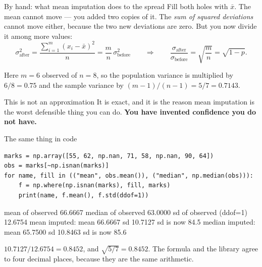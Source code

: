 \documentclass[aspectratio=169]{beamer}
\begin{document}
\begin{frame}[shrink=6]{By hand: what mean imputation does to the spread}
  Fill both holes with $\bar x$. The mean cannot move --- you added two copies
  of it. The \emph{sum of squared deviations} cannot move either, because the
  two new deviations are zero. But you now divide it among more values:
  \[
    \sigma^2_{\text{after}}
    = \frac{\sum_{i=1}^{m}(x_i - \bar x)^2}{n}
    = \frac{m}{n}\,\sigma^2_{\text{before}}
    \qquad\Longrightarrow\qquad
    \frac{\sigma_{\text{after}}}{\sigma_{\text{before}}} = \sqrt{\frac{m}{n}}
    = \sqrt{1-p}.
  \]
  \begin{center}\small
    Here $m = 6$ observed of $n = 8$, so the population variance is multiplied
    by $6/8 = 0.75$ and the sample variance by $(m-1)/(n-1) = 5/7 = 0.7143$.
  \end{center}
  \begin{alertblock}{This is not an approximation}
    \small It is exact, and it is the reason mean imputation is the worst
    defensible thing you can do. \textbf{You have invented confidence you do
    not have.}
  \end{alertblock}
\end{frame}

\begin{frame}[fragile]{The same thing in code}
\begin{lstlisting}
marks = np.array([55, 62, np.nan, 71, 58, np.nan, 90, 64])
obs = marks[~np.isnan(marks)]
for name, fill in (("mean", obs.mean()), ("median", np.median(obs))):
    f = np.where(np.isnan(marks), fill, marks)
    print(name, f.mean(), f.std(ddof=1))
\end{lstlisting}
\begin{outblk}
mean of observed         66.6667
median of observed       63.0000
sd of observed (ddof=1)  12.6754
mean   imputed:  mean 66.6667   sd 10.7127   sd is now 84.5%
median imputed:  mean 65.7500   sd 10.8463   sd is now 85.6%
\end{outblk}
\begin{center}\small
  $10.7127/12.6754 = 0.8452$, and $\sqrt{5/7} = 0.8452$. The formula and the
  library agree to four decimal places, because they are the same arithmetic.
\end{center}
\end{frame}
\end{document}
